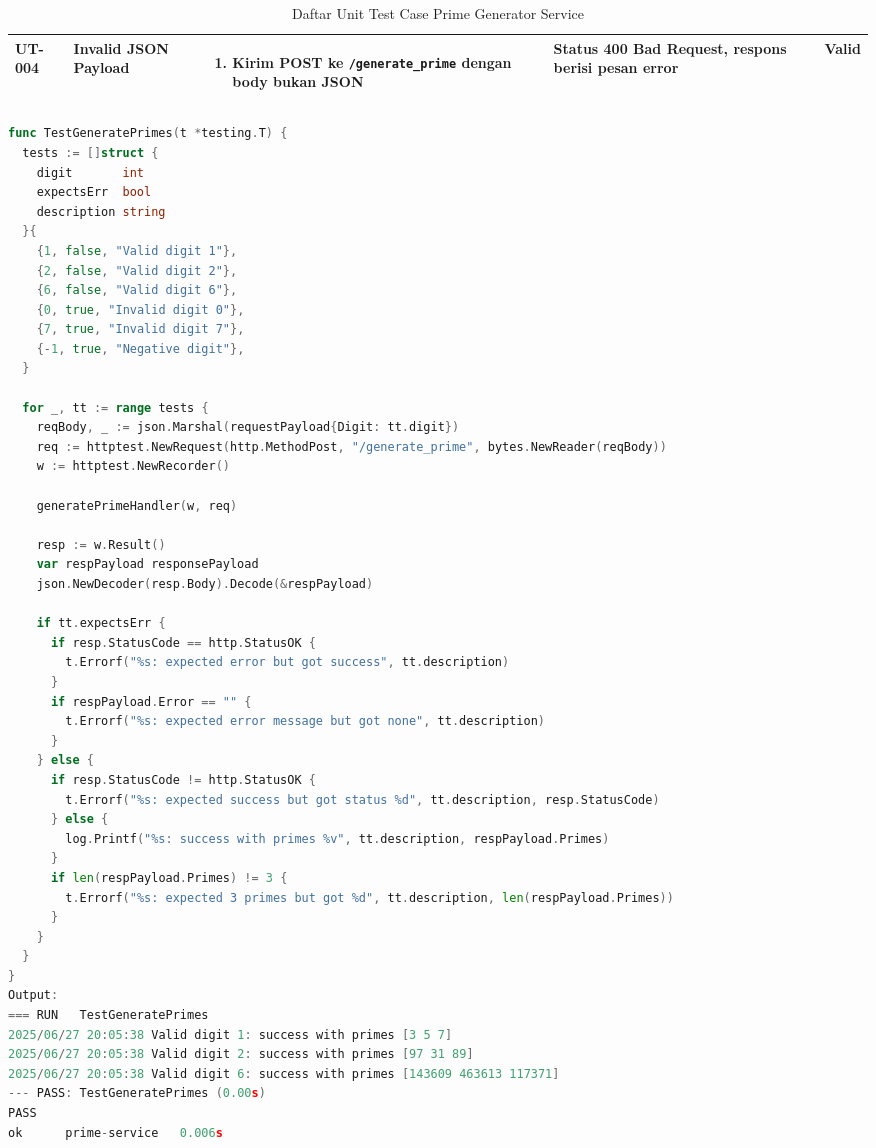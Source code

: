 \begin{table}[H]
\begin{adjustbox}{width=\textwidth}
\begin{tabular}{|p{0.8cm}|p{2.6cm}|p{4.5cm}|p{3.8cm}|p{1.2cm}|}
      UT-004                                                                        & Invalid JSON Payload               &
      \begin{enumerate}[leftmargin=*,noitemsep,topsep=0pt,label=\arabic*.,widest=99]
        \item Kirim POST ke \texttt{/generate\_prime} dengan body bukan JSON
      \end{enumerate}          &
      Status 400 Bad Request, respons berisi pesan error                            & Valid                                                                                                      \\ \hline

    \end{tabular}
  \end{adjustbox}
  \caption{Daftar Unit Test Case Prime Generator Service}
  \label{tab:unit-test-prime-generator}
\end{table}
\begin{lstlisting}[language=go, 
  basicstyle=\footnotesize\ttfamily, 
  caption={Kode Unit Testing Pada Prime Generator Service}, 
  label={lst:unit-test-prime-generator}]
func TestGeneratePrimes(t *testing.T) {
  tests := []struct {
    digit       int
    expectsErr  bool
    description string
  }{
    {1, false, "Valid digit 1"},
    {2, false, "Valid digit 2"},
    {6, false, "Valid digit 6"},
    {0, true, "Invalid digit 0"},
    {7, true, "Invalid digit 7"},
    {-1, true, "Negative digit"},
  }

  for _, tt := range tests {
    reqBody, _ := json.Marshal(requestPayload{Digit: tt.digit})
    req := httptest.NewRequest(http.MethodPost, "/generate_prime", bytes.NewReader(reqBody))
    w := httptest.NewRecorder()

    generatePrimeHandler(w, req)

    resp := w.Result()
    var respPayload responsePayload
    json.NewDecoder(resp.Body).Decode(&respPayload)

    if tt.expectsErr {
      if resp.StatusCode == http.StatusOK {
        t.Errorf("%s: expected error but got success", tt.description)
      }
      if respPayload.Error == "" {
        t.Errorf("%s: expected error message but got none", tt.description)
      }
    } else {
      if resp.StatusCode != http.StatusOK {
        t.Errorf("%s: expected success but got status %d", tt.description, resp.StatusCode)
      } else {
        log.Printf("%s: success with primes %v", tt.description, respPayload.Primes)
      }
      if len(respPayload.Primes) != 3 {
        t.Errorf("%s: expected 3 primes but got %d", tt.description, len(respPayload.Primes))
      }
    }
  }
}
Output: 
=== RUN   TestGeneratePrimes
2025/06/27 20:05:38 Valid digit 1: success with primes [3 5 7]
2025/06/27 20:05:38 Valid digit 2: success with primes [97 31 89]
2025/06/27 20:05:38 Valid digit 6: success with primes [143609 463613 117371]
--- PASS: TestGeneratePrimes (0.00s)
PASS
ok      prime-service   0.006s
\end{lstlisting}
